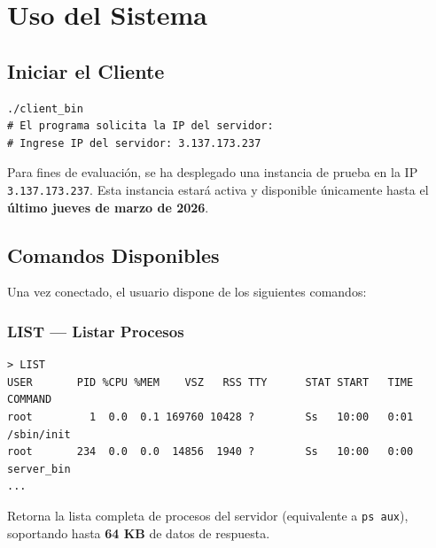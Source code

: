 \documentclass[12pt,a4paper]{report}
\begin{document}
\chapter{Uso del Sistema}

\section{Iniciar el Cliente}

\begin{tcolorbox}[colback=black!85, colframe=black, title=\textcolor{white}{\textbf{Terminal}}]
\begin{lstlisting}[style=bashstyle, numbers=none]
./client_bin
# El programa solicita la IP del servidor:
# Ingrese IP del servidor: 3.137.173.237
\end{lstlisting}
\end{tcolorbox}

\begin{tcolorbox}[colback=azulTitulo!10, colframe=azulTitulo, title=\textbf{Nota de Disponibilidad}]
Para fines de evaluación, se ha desplegado una instancia de prueba en la IP \texttt{3.137.173.237}. Esta instancia estará activa y disponible únicamente hasta el \textbf{último jueves de marzo de 2026}.
\end{tcolorbox}

\section{Comandos Disponibles}

Una vez conectado, el usuario dispone de los siguientes comandos:

\subsection{LIST — Listar Procesos}

\begin{tcolorbox}[colback=black!85, colframe=black]
\begin{lstlisting}[style=bashstyle, numbers=none]
> LIST
USER       PID %CPU %MEM    VSZ   RSS TTY      STAT START   TIME COMMAND
root         1  0.0  0.1 169760 10428 ?        Ss   10:00   0:01 /sbin/init
root       234  0.0  0.0  14856  1940 ?        Ss   10:00   0:00 server_bin
...
\end{lstlisting}
\end{tcolorbox}

Retorna la lista completa de procesos del servidor (equivalente a \texttt{ps aux}), soportando hasta \textbf{64 KB} de datos de respuesta.
\end{document}
